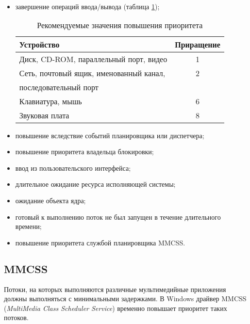 \begin{itemize}
\item завершение операций ввода/вывода (таблица \ref{tbl:input-output});

\FloatBarrier
\begin{table}[h]
	\begin{center}
        \begin{threeparttable} \captionsetup{justification=raggedright,singlelinecheck=off}
		\caption{\label{tbl:input-output} Рекомендуемые значения повышения приоритета}
		\begin{tabular}{|l|c|}
            \hline
            \textbf{Устройство} & \textbf{Приращение} \\\hline
            Диск, CD-ROM, параллельный порт, видео & 1 \\ \hline
            Сеть, почтовый ящик, именованный канал, & 2 \\
            последовательный порт & \\ \hline
            Клавиатура, мышь & 6 \\ \hline
            Звуковая плата & 8 \\ \hline
		\end{tabular}
        \end{threeparttable}
	\end{center}
\end{table}
\FloatBarrier
    \item повышение вследствие событий планировщика или диспетчера;
    \item повышение приоритета владельца блокировки;
    \item ввод из пользовательского интерфейса;
    \item длительное ожидание ресурса исполняющей системы;
    \item ожидание объекта ядра;
    \item готовый к выполнению поток не был запущен в течение длительного времени;
    \item повышение приоритета службой планировщика MMCSS.
\end{itemize}

\subsection{MMCSS}

Потоки, на которых выполняются различные мультимедийные приложения должны выполняться с минимальными задержками. В Windows драйвер MMCSS (\textit{MultiMedia Class Scheduler Service}) временно повышает приоритет таких потоков. 

